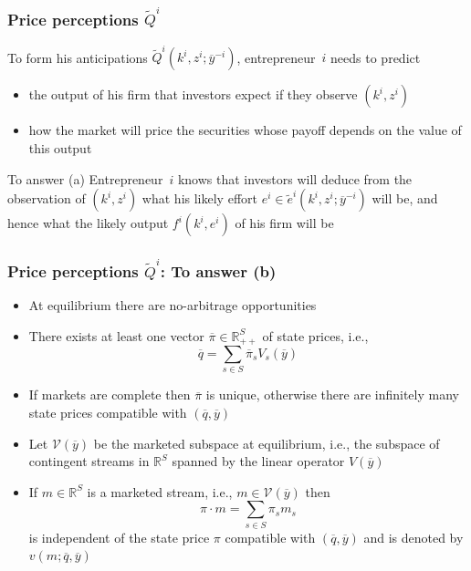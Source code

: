 \documentclass[blue]{beamer}
\def\R{\mathbb{R}}
\theoremstyle{definition}
\theoremstyle{example}
\begin{document}
\begin{frame}\frametitle{Price perceptions $\widetilde{Q}^i$}

To form his anticipations $\widetilde{Q}^i({k}^i,{z}^i;\overline{y}^{-i})$, entrepreneur~$i$ needs to predict
\begin{itemize}
\item[(a)] the \alert{output} of his firm that investors expect if they observe $({k}^i,{z}^i)$
\item[(b)] how the market will \alert{price} the securities whose payoff depends on the value of this output
\end{itemize}

\begin{block}{To answer (a)}
Entrepreneur~$i$ knows that investors will deduce from the observation of $({k}^i,{z}^i)$ what his likely effort ${e}^i \in \widetilde{e}^i(k^i,z^i;\overline{y}^{-i})$ will be, and hence what the likely output $f^i({k}^i,{e}^i)$ of his
firm will be
\end{block}

\end{frame}


\begin{frame}\frametitle{Price perceptions $\widetilde{Q}^i$: To answer (b)}

\begin{itemize}
\item At equilibrium there are no-arbitrage opportunities
\item There exists at least one vector $\overline{\pi} \in \R^S_{++}$ of state prices, i.e.,
\[
\overline{q} = \sum_{s\in S} \overline{\pi}_s V_s(\overline{y})
\]
\item If markets are complete then $\overline{\pi}$ is unique, otherwise there are infinitely many state prices compatible with $(\overline{q},\overline{y})$
\item Let $\mathcal{V}(\overline{y})$ be the marketed subspace at equilibrium, i.e., the subspace of contingent streams in $\R^S$ spanned by the linear operator $V(\overline{y})$
\item If $m \in \R^S$ is a marketed stream, i.e., $m \in \mathcal{V}(\overline{y})$ then
\[
\pi \cdot m = \sum_{s\in S} \pi_s m_s
\]
is independent of the state price $\pi$ compatible with $(\overline{q},\overline{y})$ and is denoted by $v(m;\overline{q},\overline{y})$
\end{itemize}
\end{frame}
\end{document}
